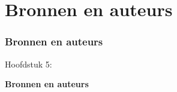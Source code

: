 %

\section{Bronnen en auteurs}
\begin{frame}[fragile]
	\frametitle{Bronnen en auteurs}

	\begin{center}\huge{Hoofdstuk 5:}\end{center}
	\begin{center}\huge{\color{typo3darkgrey}\textbf{Bronnen en auteurs}}\end{center}

\end{frame}


